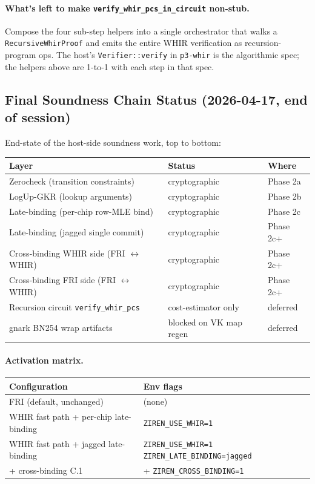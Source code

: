 \paragraph{What's left to make \texttt{verify\_whir\_pcs\_in\_circuit}
non-stub.}
Compose the four sub-step helpers into a single orchestrator that
walks a \texttt{RecursiveWhirProof} and emits the entire WHIR
verification as recursion-program ops.  The host's
\texttt{Verifier::verify} in \texttt{p3-whir} is the algorithmic
spec; the helpers above are 1-to-1 with each step in that spec.

\subsection{Final Soundness Chain Status (2026-04-17, end of session)}

End-state of the host-side soundness work, top to bottom:

\begin{tabular}{lll}
\toprule
\textbf{Layer} & \textbf{Status} & \textbf{Where} \\
\midrule
Zerocheck (transition constraints)        & cryptographic & Phase 2a \\
LogUp-GKR (lookup arguments)              & cryptographic & Phase 2b \\
Late-binding (per-chip row-MLE bind)      & cryptographic & Phase 2c \\
Late-binding (jagged single commit)       & cryptographic & Phase 2c+ \\
Cross-binding WHIR side (FRI $\leftrightarrow$ WHIR) & cryptographic & Phase 2c+ \\
Cross-binding FRI side (FRI $\leftrightarrow$ WHIR) & cryptographic & Phase 2c+ \\
\midrule
Recursion circuit \texttt{verify\_whir\_pcs} & cost-estimator only & deferred \\
gnark BN254 wrap artifacts                & blocked on VK map regen & deferred \\
\bottomrule
\end{tabular}

\paragraph{Activation matrix.}
\begin{tabular}{ll}
\toprule
\textbf{Configuration} & \textbf{Env flags} \\
\midrule
FRI (default, unchanged)                 & (none) \\
WHIR fast path + per-chip late-binding   & \texttt{ZIREN\_USE\_WHIR=1} \\
WHIR fast path + jagged late-binding     & \texttt{ZIREN\_USE\_WHIR=1
                                            ZIREN\_LATE\_BINDING=jagged} \\
+ cross-binding C.1                      & + \texttt{ZIREN\_CROSS\_BINDING=1} \\
\bottomrule
\end{tabular}

